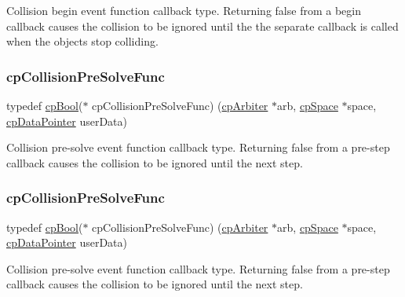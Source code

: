 Collision begin event function callback type. Returning false from a begin callback causes the collision to be ignored until the the separate callback is called when the objects stop colliding. \mbox{\label{group__cpSpace_ga89b24d53d81a5a028198c3c2d3c39a9d}} 
\subsubsection{\texorpdfstring{cp\+Collision\+Pre\+Solve\+Func}{cpCollisionPreSolveFunc}\hspace{0.1cm}{\footnotesize\ttfamily [1/2]}}
{\footnotesize\ttfamily typedef \hyperlink{group__basicTypes_gabc5e752c48f3449ca26ef413ecbd647e}{cp\+Bool}($\ast$ cp\+Collision\+Pre\+Solve\+Func) (\hyperlink{structcpArbiter}{cp\+Arbiter} $\ast$arb, \hyperlink{structcpSpace}{cp\+Space} $\ast$space, \hyperlink{group__basicTypes_ga2ac2c3c31e21893941f9e4f8ee279447}{cp\+Data\+Pointer} user\+Data)}

Collision pre-\/solve event function callback type. Returning false from a pre-\/step callback causes the collision to be ignored until the next step. \mbox{\label{group__cpSpace_ga89b24d53d81a5a028198c3c2d3c39a9d}} 
\subsubsection{\texorpdfstring{cp\+Collision\+Pre\+Solve\+Func}{cpCollisionPreSolveFunc}\hspace{0.1cm}{\footnotesize\ttfamily [2/2]}}
{\footnotesize\ttfamily typedef \hyperlink{group__basicTypes_gabc5e752c48f3449ca26ef413ecbd647e}{cp\+Bool}($\ast$ cp\+Collision\+Pre\+Solve\+Func) (\hyperlink{structcpArbiter}{cp\+Arbiter} $\ast$arb, \hyperlink{structcpSpace}{cp\+Space} $\ast$space, \hyperlink{group__basicTypes_ga2ac2c3c31e21893941f9e4f8ee279447}{cp\+Data\+Pointer} user\+Data)}

Collision pre-\/solve event function callback type. Returning false from a pre-\/step callback causes the collision to be ignored until the next step. 

